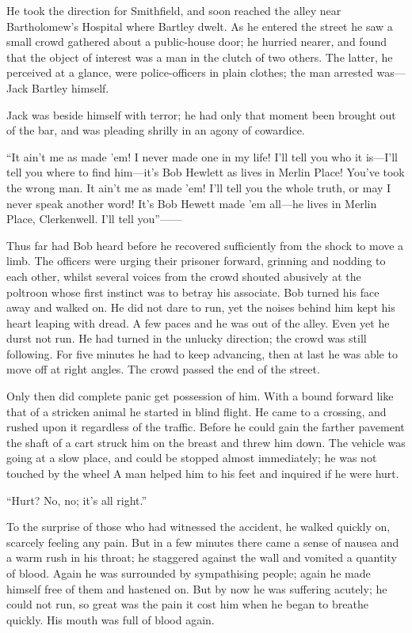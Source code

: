 He took the direction for Smithfield, and soon reached the alley near
Bartholomew's Hospital where Bartley dwelt. As he entered the street he
saw a small crowd gathered about {}a public-house door; he hurried
nearer, and found that the object of interest was a man in the clutch of
two others. The latter, he perceived at a glance, were police-officers
in plain clothes; the man arrested was---Jack Bartley himself.

Jack was beside himself with terror; he had only that moment been
brought out of the bar, and was pleading shrilly in an agony of
cowardice.

``It ain't me as made 'em! I never made one in my life! I'll tell you
who it is---I'll tell you where to find him---it's Bob Hewlett as lives
in Merlin Place! You've took the wrong man. It ain't me as made 'em!
I'll tell you the whole truth, or may I never speak another word! It's
Bob Hewett made 'em all---he lives in Merlin Place, Clerkenwell. I'll
tell you''{{------}}

Thus far had Bob heard before he recovered sufficiently from the shock
to move a limb. The officers were urging their prisoner forward,
grinning and nodding to each other, whilst several voices from the crowd
shouted abusively at the poltroon whose first instinct was to betray his
associate. Bob turned his face {}away and walked on. He did not dare to
run, yet the noises behind him kept his heart leaping with dread. A few
paces and he was out of the alley. Even yet he durst not run. He had
turned in the unlucky direction; the crowd was still following. For five
minutes he had to keep advancing, then at last he was able to move off
at right angles. The crowd passed the end of the street.

Only then did complete panic get possession of him. With a bound forward
like that of a stricken animal he started in blind flight. He came to a
crossing, and rushed upon it regardless of the traffic. Before he could
gain the farther pavement the shaft of a cart struck him on the breast
and threw him down. The vehicle was going at a slow place, and could be
stopped almost immediately; he was not touched by the wheel A man helped
him to his feet and inquired if he were hurt.

``Hurt? No, no; it's all right.''

To the surprise of those who had witnessed the accident, he walked
quickly on, scarcely feeling any pain. But in a few minutes there came a
sense of nausea and a warm rush in his throat; he staggered against the
wall and {}vomited a quantity of blood. Again he was surrounded by
sympathising people; again he made himself free of them and hastened on.
But by now he was suffering acutely; he could not run, so great was the
pain it cost him when he began to breathe quickly. His mouth was full of
blood again.

